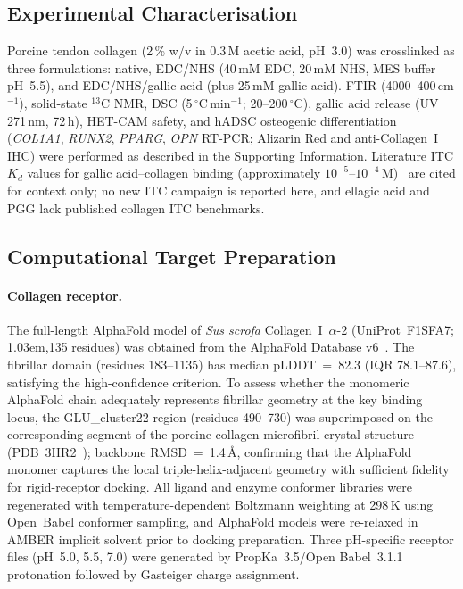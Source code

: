\documentclass[11pt]{article}
\begin{document}
\subsection{Experimental Characterisation}
\label{sec:exp}

Porcine tendon collagen (2\,\% w/v in 0.3\,M acetic acid, pH~3.0) was
crosslinked as three formulations: native, EDC/NHS (40\,mM EDC, 20\,mM NHS,
MES buffer pH~5.5), and EDC/NHS/gallic acid (plus 25\,mM gallic acid).
FTIR (4000--400\,cm$^{-1}$), solid-state $^{13}$C NMR, DSC
(5\,$^{\circ}$C\,min$^{-1}$; 20--200\,$^{\circ}$C), gallic acid release
(UV 271\,nm, 72\,h), HET-CAM safety, and hADSC osteogenic differentiation
(\emph{COL1A1}, \emph{RUNX2}, \emph{PPARG}, \emph{OPN} RT-PCR; Alizarin Red
and anti-Collagen~I IHC) were performed as described in the Supporting
Information.
Literature ITC $K_{d}$ values for gallic acid--collagen binding
(approximately $10^{-5}$--$10^{-4}$\,M)~\cite{carvalho2023gallic} are cited
for context only; no new ITC campaign is reported here, and ellagic acid
and PGG lack published collagen ITC benchmarks.

\subsection{Computational Target Preparation}
\label{sec:target_prep}

\paragraph{Collagen receptor.}
The full-length AlphaFold model of \emph{Sus scrofa}
Collagen~I~$\alpha$-2 (UniProt~F1SFA7; 1\kern .03em,135 residues) was
obtained from the AlphaFold Database
v6~\cite{jumper2021alphafold}.  The fibrillar domain
(residues 183--1135) has median pLDDT~=~82.3 (IQR 78.1--87.6),
satisfying the high-confidence criterion.
To assess whether the monomeric AlphaFold chain adequately represents
fibrillar geometry at the key binding locus, the GLU\_cluster22 region
(residues 490--730) was superimposed on the corresponding segment of
the porcine collagen microfibril crystal structure
(PDB~3HR2~\cite{orgel2006fibril}); backbone RMSD~=~1.4\,\AA,
confirming that the AlphaFold monomer captures the local
triple-helix-adjacent geometry with sufficient fidelity for
rigid-receptor docking.
All ligand and enzyme conformer libraries were regenerated with
temperature-dependent Boltzmann weighting at
298\,K using Open~Babel conformer sampling, and
AlphaFold models were re-relaxed in AMBER implicit
solvent prior to docking preparation.
Three pH-specific receptor files (pH~5.0, 5.5, 7.0) were generated by
PropKa~3.5/Open Babel~3.1.1~\cite{olsson2011propka} protonation
followed by Gasteiger charge assignment.
\end{document}
